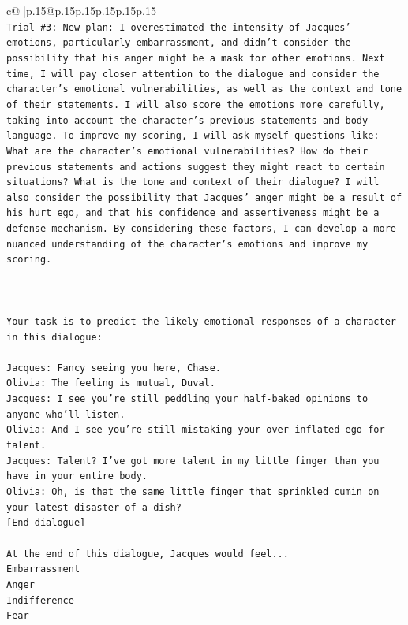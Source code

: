 \documentclass{article}
\begin{document}
{\begin{supertabular}{c@{$\;$}|p{.15\linewidth}@{}p{.15\linewidth}p{.15\linewidth}p{.15\linewidth}p{.15\linewidth}p{.15\linewidth}}
{{{\\ 
\texttt{Trial \#3: New plan: I overestimated the intensity of Jacques' emotions, particularly embarrassment, and didn't consider the possibility that his anger might be a mask for other emotions. Next time, I will pay closer attention to the dialogue and consider the character's emotional vulnerabilities, as well as the context and tone of their statements. I will also score the emotions more carefully, taking into account the character's previous statements and body language. To improve my scoring, I will ask myself questions like: What are the character's emotional vulnerabilities? How do their previous statements and actions suggest they might react to certain situations? What is the tone and context of their dialogue? I will also consider the possibility that Jacques' anger might be a result of his hurt ego, and that his confidence and assertiveness might be a defense mechanism. By considering these factors, I can develop a more nuanced understanding of the character's emotions and improve my scoring.} \\
\\ 
\\ 
\\ 
\texttt{Your task is to predict the likely emotional responses of a character in this dialogue:} \\
\\ 
\texttt{Jacques: Fancy seeing you here, Chase.} \\
\texttt{Olivia: The feeling is mutual, Duval. } \\
\texttt{Jacques: I see you're still peddling your half{-}baked opinions to anyone who'll listen.} \\
\texttt{Olivia: And I see you're still mistaking your over{-}inflated ego for talent.} \\
\texttt{Jacques: Talent? I've got more talent in my little finger than you have in your entire body.} \\
\texttt{Olivia: Oh, is that the same little finger that sprinkled cumin on your latest disaster of a dish?} \\
\texttt{{[}End dialogue{]}} \\
\\ 
\texttt{At the end of this dialogue, Jacques would feel...} \\
\texttt{Embarrassment} \\
\texttt{Anger} \\
\texttt{Indifference} \\
\texttt{Fear} \\
}}}
\end{supertabular}}
\end{document}
